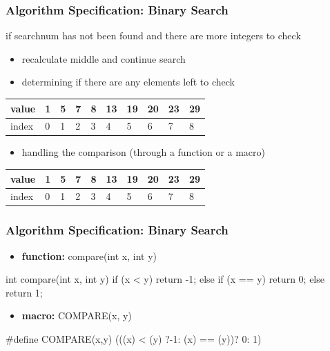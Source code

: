 \documentclass[newPxFont,sthlmFooter,nooffset]{beamer}
\begin{document}
\begin{frame}[t]
	\frametitle{Algorithm Specification: Binary Search}
	if searchnum has not been found
	and there are more integers to check
	\begin{itemize}
		\item recalculate middle and continue search
		\item determining if there are any elements left to check
	\end{itemize}
\begin{center}
	\begin{tabular}{| l | l | l | l | l | l | l | l | l | l |}
		\hline
		value & 1 & 5 & 7 & 8 & 13 & \cellcolor{green}19 & \cellcolor{yellow}20 & 23 & \cellcolor{red}29 \\
		\hline
		index & 0 & 1 & 2 & 3 & 4 & \cellcolor{green}5 & \cellcolor{yellow}6 & 7 & \cellcolor{red}8 \\
		\hline
	\end{tabular}
\end{center}
	\begin{itemize}
		\item handling the comparison (through a function or a macro)
	\end{itemize}

	\begin{center}
		\begin{tabular}{| l | l | l | l | l | l | l | l | l | l |}
			\hline
			value & 1 & 5 & 7 & 8 & 13 & 19 & 20 & \cellcolor{green}23 & \cellcolor{red}29 \\
			\hline
			index & 0 & 1 & 2 & 3 & 4 & 5 & 6 & \cellcolor{green}7 & \cellcolor{red}8 \\
			\hline
		\end{tabular}
	\end{center}
\end{frame}
\begin{frame}[t, fragile]
  \frametitle{Algorithm Specification: Binary Search}

\begin{itemize}
	\item\textbf {function:} compare(int x, int y)
\end{itemize}

\begin{codedef}
int compare(int x, int y){
	if (x < y) return -1;
	else if (x == y) return 0;
		else return 1;
}
\end{codedef}

\begin{itemize}
	\item\textbf {macro:} COMPARE(x, y)
\end{itemize}

\begin{codedef}
#define COMPARE(x,y) (((x) < (y) ?-1:  (x) == (y))? 0: 1)
\end{codedef}

\end{frame}
\end{document}

